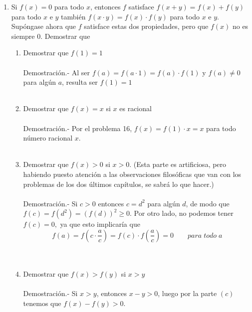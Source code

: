 \begin{enumerate}[\bfseries 1.]
\begin{enumerate}[\bfseries (a)]
	\end{enumerate}

	\item Si $f(x)=0$ para todo $x$, entonces $f$ satisface $f(x+y)=f(x) + f(y)$ para todo $x$ e $y$ también $f(x\cdot y)=f(x)\cdot f(y)$ para todo $x$ e $y$. Supóngase ahora que $f$ satisface estas dos propiedades, pero que $f(x)$ no es siempre $0$. Demostrar que 

	\begin{enumerate}[\bfseries (a)]

	    \item Demostrar que $f(1)=1$\\\\
		Demostración.-\; Al ser $f(a)=f(a\cdot 1)=f(a)\cdot f(1)$ y $f(a)\neq 0$ para algún $a$, resulta ser $f(1)=1$\\\\

	    \item Demostrar que $f(x)=x$ si $x$ es racional \\\\
		Demostración.-\; Por el problema 16, $f(x)=f(1)\cdot x = x$ para todo número racional $x$. \\\\ 

	    \item Demostrar que $f(x)>0$ si $x>0$. (Esta parte es artificiosa, pero habiendo puesto atención a las observaciones filosóficas que van con los problemas de los dos últimos capítulos, se sabrá lo que hacer.)\\\\
		Demostración.-\; Si $c>0$ entonces $c=d^2$ para algún $d$, de modo que $f(c)=f(d^2)=(f(d))^2\geq 0$. Por otro lado, no podemos tener $f(c)=0,$ ya que esto implicaría que $$f(a)=f\left( c\cdot \dfrac{a}{c}\right) = f(c)\cdot f\left(\dfrac{a}{c}\right) = 0 \qquad para \; todo \; a$$\\\\

	    \item Demostrar que $f(x)>f(y)$ si $x>y$\\\\
		Demostración.-\; Si $x>y$, entonces $x-y>0$, luego por la parte $(c)$ tenemos que $f(x)-f(y)>0$. \\\\ 


\end{enumerate}
\end{enumerate}
